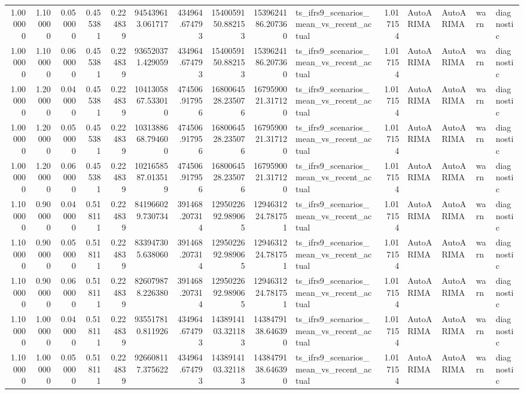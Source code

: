 \begin{tabular}{rrrrrrrrrlrllll}
1.000000 & 1.100000 & 0.050000 & 0.455381 & 0.224839 & 945439613.061717 & 434964.674793 & 1540059150.882153 & 1539624186.207360 & ts_ifrs9_scenarios_mean_vs_recent_actual & 1.017154 & AutoARIMA & AutoARIMA & warn & diagnostic \\
1.000000 & 1.100000 & 0.060000 & 0.455381 & 0.224839 & 936520371.429059 & 434964.674793 & 1540059150.882153 & 1539624186.207360 & ts_ifrs9_scenarios_mean_vs_recent_actual & 1.017154 & AutoARIMA & AutoARIMA & warn & diagnostic \\
1.000000 & 1.200000 & 0.040000 & 0.455381 & 0.224839 & 1041305867.533010 & 474506.917956 & 1680064528.235076 & 1679590021.317120 & ts_ifrs9_scenarios_mean_vs_recent_actual & 1.017154 & AutoARIMA & AutoARIMA & warn & diagnostic \\
1.000000 & 1.200000 & 0.050000 & 0.455381 & 0.224839 & 1031388668.794600 & 474506.917956 & 1680064528.235076 & 1679590021.317120 & ts_ifrs9_scenarios_mean_vs_recent_actual & 1.017154 & AutoARIMA & AutoARIMA & warn & diagnostic \\
1.000000 & 1.200000 & 0.060000 & 0.455381 & 0.224839 & 1021658587.013519 & 474506.917956 & 1680064528.235076 & 1679590021.317120 & ts_ifrs9_scenarios_mean_vs_recent_actual & 1.017154 & AutoARIMA & AutoARIMA & warn & diagnostic \\
1.100000 & 0.900000 & 0.040000 & 0.518111 & 0.224839 & 841966029.730734 & 391468.207314 & 1295022692.989065 & 1294631224.781751 & ts_ifrs9_scenarios_mean_vs_recent_actual & 1.017154 & AutoARIMA & AutoARIMA & warn & diagnostic \\
1.100000 & 0.900000 & 0.050000 & 0.518111 & 0.224839 & 833947305.638060 & 391468.207314 & 1295022692.989065 & 1294631224.781751 & ts_ifrs9_scenarios_mean_vs_recent_actual & 1.017154 & AutoARIMA & AutoARIMA & warn & diagnostic \\
1.100000 & 0.900000 & 0.060000 & 0.518111 & 0.224839 & 826079878.226380 & 391468.207314 & 1295022692.989065 & 1294631224.781751 & ts_ifrs9_scenarios_mean_vs_recent_actual & 1.017154 & AutoARIMA & AutoARIMA & warn & diagnostic \\
1.100000 & 1.000000 & 0.040000 & 0.518111 & 0.224839 & 935517810.811926 & 434964.674793 & 1438914103.321183 & 1438479138.646390 & ts_ifrs9_scenarios_mean_vs_recent_actual & 1.017154 & AutoARIMA & AutoARIMA & warn & diagnostic \\
1.100000 & 1.000000 & 0.050000 & 0.518111 & 0.224839 & 926608117.375622 & 434964.674793 & 1438914103.321183 & 1438479138.646390 & ts_ifrs9_scenarios_mean_vs_recent_actual & 1.017154 & AutoARIMA & AutoARIMA & warn & diagnostic \\

\end{tabular}
